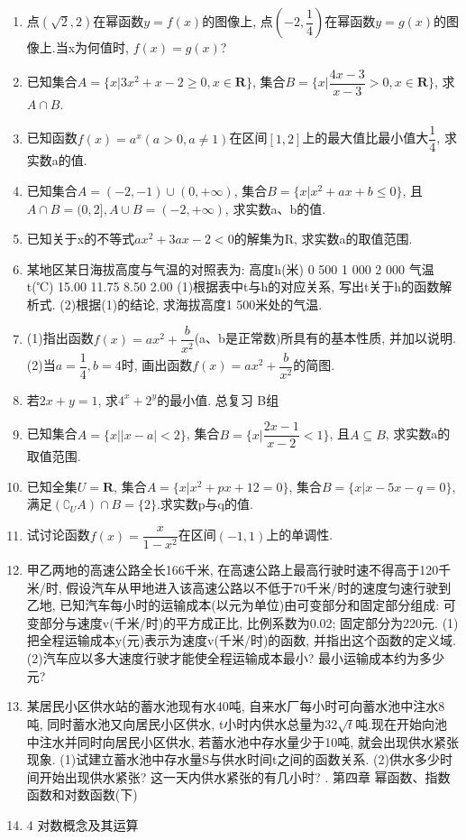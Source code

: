 \documentclass[10pt,a4paper]{article}
\begin{document}
\begin{enumerate}[1.]
\item 点$(\sqrt 2,2)$在幂函数$y=f(x)$的图像上, 点$(-2,\dfrac 14)$在幂函数$y=g(x)$的图像上.当x为何值时, $f(x)=g(x)$?
\item 已知集合$A=\{x|3x^2+x-2\ge 0,x\in \mathbf{R}\}$, 集合$B=\{x|\dfrac{4x-3}{x-3}>0,x\in \mathbf{R}\}$, 求$A\cap B$.
\item 已知函数$f(x)=a^x(a>0,a\ne 1)$在区间$[1,2]$上的最大值比最小值大$\dfrac 14$, 求实数a的值.
\item 已知集合$A=(-2,-1)\cup (0,+\infty)$, 集合$B=\{x|x^2+ax+b\le 0\}$, 且$A\cap B=(0,2],A\cup B=(-2,+\infty)$, 求实数a、b的值.
\item 已知关于x的不等式$ax^2+3ax-2<0$的解集为R, 求实数a的取值范围.
\item 某地区某日海拔高度与气温的对照表为:
高度h(米)	0	500	1 000 	2 000
气温t(℃)	15.00	11.75	8.50	2.00
(1)根据表中t与h的对应关系, 写出t关于h的函数解析式.
(2)根据(1)的结论, 求海拔高度1 500米处的气温.
\item (1)指出函数$f(x)=ax^2+\dfrac b{x^2}$(a、b是正常数)所具有的基本性质, 并加以说明.
(2)当$a=\dfrac 14,b=4$时, 画出函数$f(x)=ax^2+\dfrac b{x^2}$的简图.
\item 若$2x+y=1$, 求$4^x+2^y$的最小值.
总复习
B组
\item 已知集合$A=\{x||x-a|<2\}$, 集合$B=\{x|\dfrac{2x-1}{x-2}<1\}$, 且$A\subseteq B$, 求实数a的取值范围.
\item 已知全集$U=\mathbf{R}$, 集合$A=\{x|x^2+px+12=0\}$, 集合$B=\{x|x-5x-q=0\}$, 满足$(\complement _UA)\cap B=\{2\}$.求实数p与q的值.
\item 试讨论函数$f(x)=\dfrac x{1-x^2}$在区间$(-1,1)$上的单调性.
\item 甲乙两地的高速公路全长166千米, 在高速公路上最高行驶时速不得高于120千米/时, 假设汽车从甲地进入该高速公路以不低于70千米/时的速度匀速行驶到乙地, 已知汽车每小时的运输成本(以元为单位)由可变部分和固定部分组成: 可变部分与速度v(千米/时)的平方成正比, 比例系数为0.02; 固定部分为220元.
(1)把全程运输成本y(元)表示为速度v(千米/时)的函数, 并指出这个函数的定义域.
(2)汽车应以多大速度行驶才能使全程运输成本最小? 最小运输成本约为多少元?
\item 某居民小区供水站的蓄水池现有水40吨, 自来水厂每小时可向蓄水池中注水8吨, 同时蓄水池又向居民小区供水, t小时内供水总量为$32\sqrt t$吨.现在开始向池中注水并同时向居民小区供水, 若蓄水池中存水量少于10吨, 就会出现供水紧张现象.
(1)试建立蓄水池中存水量S与供水时间t之间的函数关系.
(2)供水多少时间开始出现供水紧张? 这一天内供水紧张的有几小时?
.
第四章  幂函数、指数函数和对数函数(下)
\item 4  对数概念及其运算

\end{enumerate}
\end{document}
